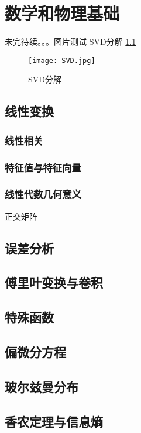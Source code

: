 \chapter{数学和物理基础}
未完待续。。。图片测试
SVD分解 \ref{1}
\begin{figure}[htbp]
	\centering
	\texttt{[image: SVD.jpg]}
	\caption{SVD分解}
	\label{1}
\end{figure}
\section{线性变换}
\subsection{线性相关}
\subsection{特征值与特征向量}
\subsection{线性代数几何意义}
正交矩阵


\section{误差分析}


\section{傅里叶变换与卷积}


\section{特殊函数}



\section{偏微分方程}


\section{玻尔兹曼分布}


\section{香农定理与信息熵}
